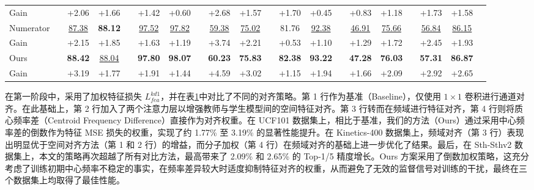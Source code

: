 \documentclass[10.5pt,letterpaper]{article}
\begin{document}
\begin{table}[!htb]
{{\begin{tabular}{l ccccccc cccccc cccccc}
				{\color{red} Gain} && {\color{red} +2.06} & {\color{red} +1.66} && {\color{red} +1.42} & {\color{red} +0.60} && {\color{red} +2.68} & {\color{red} +1.57} && {\color{red} +1.70} & {\color{red} +0.45} && {\color{red} +0.83} & {\color{red} +1.18} && {\color{red} +1.73} & {\color{red} +1.58} & \\
				\cmidrule(lr{0.5pt}){1-20}
				Numerator       && \underline{87.38} & {\bf 88.12} && \underline{97.52} & \underline{97.82} && \underline{59.38} & \underline{75.02} && 81.76 & \underline{92.38} && \underline{46.91} & \underline{75.66} && \underline{56.84} & \underline{86.15} & \\
				{\color{red} Gain} && {\color{red} +2.15} & {\color{red} +1.85} && {\color{red} +1.63} & {\color{red} +1.19} && {\color{red} +3.74} & {\color{red} +2.21} && {\color{red} +0.53} & {\color{red} +1.10} && {\color{red} +1.29} & {\color{red} +1.72} && {\color{red} +2.45} & {\color{red} +1.93} & \\
				\midrule[0.5pt]
				Ours            && {\bf 88.42} & \underline{88.04} && {\bf 97.80} & {\bf 98.07} && {\bf 60.23} & {\bf 75.83} && {\bf 82.38} & {\bf 93.22} && {\bf 47.28} & {\bf 76.03} && {\bf 57.31} & {\bf 86.87} & \\
				{\color{red} Gain} && {\color{red} +3.19} & {\color{red} +1.77} && {\color{red} +1.91} & {\color{red} +1.44} && {\color{red} +4.59} & {\color{red} +3.02} && {\color{red} +1.15} & {\color{red} +1.94} && {\color{red} +1.66} & {\color{red} +2.09} && {\color{red} +2.92} & {\color{red} +2.65} & \\
				\bottomrule[0.75pt]
			\end{tabular}
		}
	}
	\label{tab.similarity-ucf101}
\end{table}

在第一阶段中，采用了加权特征损失 $L_{fea}^{kd1}$，并在表\ref{tab.similarity-ucf101}中对比了不同的对齐策略。第 1 行作为基准（Baseline），仅使用 $1 \times 1$ 卷积进行通道对齐。在此基础上，第 2 行加入了两个注意力层以增强教师与学生模型间的空间特征对齐。第 3 行转而在频域进行特征对齐，第 4 行则将质心频率差（Centroid Frequency Difference）直接作为对齐权重。在 UCF101 数据集上，相比于基准，我们的方法（Ours）通过采用中心频率差的倒数作为特征 MSE 损失的权重，实现了约 1.77\% 至 3.19\% 的显著性能提升。在 Kinetics-400 数据集上，频域对齐（第 3 行）表现出明显优于空间对齐方法（第 1 和 2 行）的增益，而分子加权（第 4 行）在频域对齐的基础上进一步优化了结果。最后，在 Sth-Sthv2 数据集上，本文的策略再次超越了所有对比方法，最高带来了 2.09\% 和 2.65\% 的 Top-1/5 精度增长。Ours 方案采用了倒数加权策略，这充分考虑了训练初期中心频率不稳定的事实，在频率差异较大时适度抑制特征对齐的权重，从而避免了无效的监督信号对训练的干扰，最终在三个数据集上均取得了最佳性能。
\end{document}
